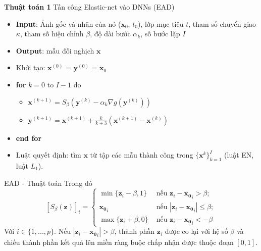 \begin{frame}
    \begin{center}
        \textbf{Thuật toán 1} Tấn công Elastic-net vào DNNs (EAD)
        \begin{itemize}
            \item[] \textbf{Input}: Ảnh gốc và nhãn của nó ($\mathbf{x}_0$, $t_0$), lớp mục tiêu $t$, tham số chuyển giao $\kappa$, tham số hiệu chỉnh $\beta$, độ dài bước $\alpha_k$, số bước lặp $I$
            \item[] \textbf{Output}: mẫu đối nghịch $\mathbf{x}$
            \item[] Khởi tạo: $\mathbf{x}^{(0)}$ = $\mathbf{y}^{(0)}$ = $\mathbf{x}_0$
            \item[] \textbf{for} $k = 0$ to $I - 1$ do
            \begin{itemize}
                \item[] $\mathbf{x}^{(k+1)} = S_{\beta}(\mathbf{y}^{(k)} -\alpha_{k} \nabla g(\mathbf{y}^{(k)}))$
                \item[] $\mathbf{y}^{(k+1)} = \mathbf{x}^{(k+1)} + \frac{k}{k+3} (\mathbf{x}^{(k+1)} - \mathbf{x}^{(k)}) $
            \end{itemize}
            \item[] \textbf{end for}
            \item[] Luật quyết định: tìm $\mathbf{x}$ từ tập các mẫu thành công trong $\{\mathbf{x}^k\}_{k=1}^{I}$ (luật EN, luật $L_1$).
        \end{itemize}
    \end{center}
\end{frame}

\begin{frame}{EAD - Thuật toán}
    Trong đó 
    \begin{equation}
        \label{eq:9}
        [S_{\beta}(\mathbf{z})]_i = 
        \begin{cases}
            \min \{ \mathbf{z}_i - \beta, 1 \} &\text{ nếu } \mathbf{z}_i - \mathbf{x_0}_i  > \beta; \\
            \mathbf{x_0}_i &\text{ nếu } |\mathbf{z}_i - \mathbf{x_0}_i| \leq \beta; \\
            \max \{ \mathbf{z}_i + \beta, 0 \} &\text{ nếu } \mathbf{z}_i - \mathbf{x_0}_i < -\beta
        \end{cases}
    \end{equation}
    Với $i \in \{ 1, ..., p \}$. Nếu $|\mathbf{z}_i - \mathbf{x_0}_i| > \beta$, thành phần 
    $\mathbf{z}_i$ được co lại với hệ số $\beta$ và chiếu thành phần kết quả lên miền ràng buộc 
    chấp nhận được thuộc đoạn $[0,1]$.
\end{frame}